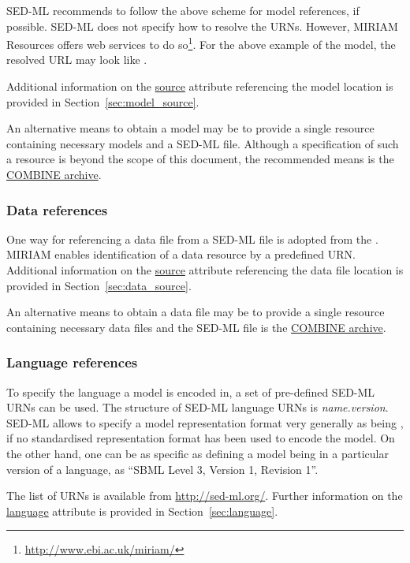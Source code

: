 SED-ML recommends to follow the above scheme for model references, if possible. 
SED-ML does not specify how to resolve the URNs. However, MIRIAM Resources offers web services to do so\footnote{\url{http://www.ebi.ac.uk/miriam/}}. For the above example of the  model, the resolved URL may look like .

Additional information on the \hyperref[sec:model_source]{source} attribute referencing the model location is provided in Section~\ref{sec:model_source}.

An alternative means to obtain a model may be to provide a single resource containing necessary models and a SED-ML file. Although a specification of such a resource is beyond the scope of this document, the recommended means is the \hyperref[sec:archive]{COMBINE archive}.


\subsubsection{Data references}
\label{sec:dataURI}
One way for referencing a data file from a SED-ML file is adopted from the . MIRIAM enables identification of a data resource by a predefined URN. Additional information on the \hyperref[sec:data_source]{source} attribute referencing the data file location is provided in Section~\ref{sec:data_source}.

An alternative means to obtain a data file may be to provide a single resource containing necessary data files and the SED-ML file is the \hyperref[sec:archive]{COMBINE archive}. 


\subsubsection{Language references}
\label{sec:languageURI}
To specify the language a model is encoded in, a set of pre-defined SED-ML URNs can be used. The structure of SED-ML language URNs is \emph{name.version}. SED-ML allows to specify a model representation format very generally as being , if no standardised representation format has been used to encode the model. On the other hand, one can be as specific as defining a model being in a particular version of a language, as ``SBML Level 3, Version 1, Revision 1''.

The list of URNs is available from \url{http://sed-ml.org/}. Further information on the \hyperref[sec:language]{language} attribute is provided in Section~\ref{sec:language}.

